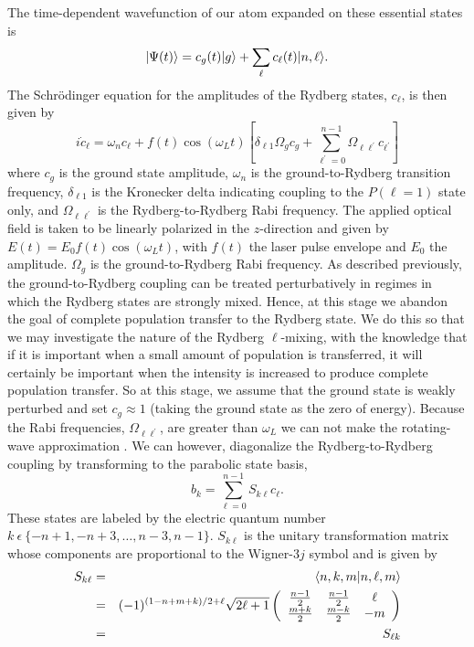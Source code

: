 The time-dependent wavefunction of our atom expanded on these essential
states is
\begin{equation}
\vert \Psi(t) \rangle = c_g(t)\vert g \rangle + \sum_{\ell} c_{\ell}(t)\vert n,\ell \rangle.
\end{equation}
The Schr\"{o}dinger equation for the amplitudes of the Rydberg states,
$c_\ell$, is then given by
\begin{equation}
i\dot{c}_\ell = \omega_n c_\ell + f(t)\cos (\omega_L t)
\left[\delta_{\ell1}\Omega_g c_g +
\sum_{\ell^{'}=0}^{n-1} \Omega_{\ell \ell^{'}} c_{\ell^{'}}\right]
\label{schrodinger_eqn}
\end{equation} 
where $c_g$ is the ground state amplitude, $\omega_n$ is the
ground-to-Rydberg transition frequency, $\delta_{\ell1}$ is the Kronecker
delta indicating coupling to the $P (\ell=1)$ state only, and
$\Omega_{\ell\ell^{'}}$ is the Rydberg-to-Rydberg Rabi frequency. The applied
optical field is taken to be linearly polarized in the $z$-direction and given
by $E(t) = E_0 f(t) \cos(\omega_L t)$, with $f(t)$ the laser pulse envelope
and $E_0$ the amplitude.  $\Omega_g$ is the ground-to-Rydberg Rabi frequency.
As described previously, the ground-to-Rydberg coupling can be treated
perturbatively in regimes in which the Rydberg states are strongly mixed.
Hence, at this stage we abandon the goal of complete population transfer to
the Rydberg state.  We do this so that we may investigate the nature of the
Rydberg $\ell$-mixing, with the knowledge that if it is important when a
small amount of population is transferred, it will certainly be important
when the intensity is increased to produce complete population transfer.
So at this stage, we assume that the ground state is weakly perturbed
and set $c_g \approx 1$ (taking the ground state as the zero of
energy). Because the Rabi frequencies, $\Omega_{\ell\ell^{'}}$, are greater
than $\omega_L$ we can not make the rotating-wave approximation
\cite{Piraux:89}.  We can however, diagonalize the Rydberg-to-Rydberg coupling
by transforming to the parabolic state basis,
\begin{equation}
b_k = \sum_{\ell=0}^{n-1} S_{k\ell} c_\ell.
\end{equation}
These states are labeled by the electric quantum number
$k\ \epsilon\ \{-n+1,-n+3,\ldots,n-3,n-1\}$.  $S_{k\ell}$
is the unitary transformation matrix whose components are proportional to the
Wigner-$3j$ symbol \cite{Gallagher_book} and is given by
\begin{eqnarray}
S_{k\ell} &=& \langle n,k,m \vert n,\ell,m \rangle \\
              &=& (-1)^{(1-n+m+k)/2 + \ell} \sqrt{2\ell+1}
\left( 
\begin{array}{ccc}
\frac{n-1}{2} & \frac{n-1}{2} & \ell  \\
\frac{m+k}{2} & \frac{m-k}{2} & -m
\end{array} \right)  \\
&=& S_{\ell k}
\end{eqnarray}
